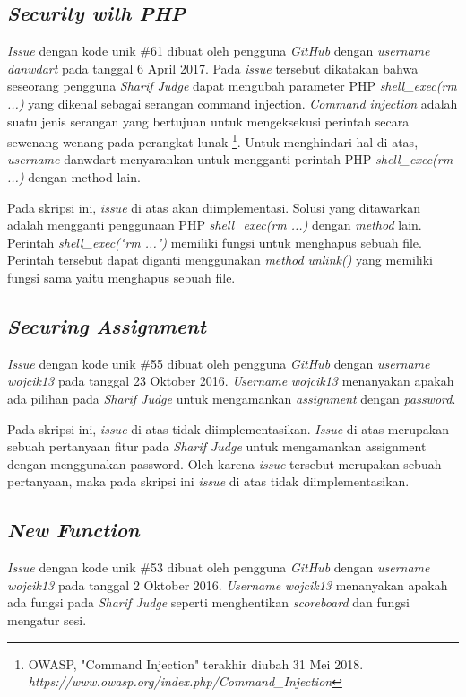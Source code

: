 \subsection{\textit{Security with PHP}}
\textit{Issue} dengan kode unik \#61 dibuat oleh pengguna \textit{GitHub} dengan \textit{username} \textit{danwdart} pada tanggal 6 April 2017. Pada \textit{issue} tersebut dikatakan bahwa seseorang pengguna \textit{Sharif Judge} dapat mengubah parameter PHP \textit{shell\_exec(rm ...)} yang dikenal sebagai serangan command injection. \textit{Command injection} adalah suatu jenis serangan yang bertujuan untuk mengeksekusi perintah secara sewenang-wenang pada perangkat lunak \footnote{OWASP, "Command Injection" terakhir diubah 31 Mei 2018. \textit{https://www.owasp.org/index.php/Command\_Injection}}. Untuk menghindari hal di atas, \textit{username} danwdart menyarankan untuk mengganti perintah PHP \textit{shell\_exec(rm ...)} dengan method lain.

Pada skripsi ini, \textit{issue} di atas akan diimplementasi. Solusi yang ditawarkan adalah mengganti penggunaan PHP \textit{shell\_exec(rm ...)} dengan \textit{method} lain.  Perintah \textit{shell\_exec("rm ...")} memiliki fungsi untuk menghapus sebuah file. Perintah tersebut dapat diganti menggunakan \textit{method} \textit{unlink()} yang memiliki fungsi sama yaitu menghapus sebuah file.

\subsection{\textit{Securing Assignment}}
\textit{Issue} dengan kode unik \#55 dibuat oleh pengguna \textit{GitHub} dengan \textit{username} \textit{wojcik13} pada tanggal 23 Oktober 2016. \textit{Username} \textit{wojcik13} menanyakan apakah ada pilihan pada \textit{Sharif Judge} untuk mengamankan \textit{assignment} dengan \textit{password}.

Pada skripsi ini, \textit{issue} di atas tidak diimplementasikan. \textit{Issue} di atas merupakan sebuah pertanyaan fitur pada \textit{Sharif Judge} untuk mengamankan assignment dengan menggunakan password. Oleh karena \textit{issue} tersebut merupakan sebuah pertanyaan, maka pada skripsi ini \textit{issue} di atas tidak diimplementasikan.

\subsection{\textit{New Function}}
\textit{Issue} dengan kode unik \#53 dibuat oleh pengguna \textit{GitHub} dengan \textit{username} \textit{wojcik13} pada tanggal 2 Oktober 2016. \textit{Username} \textit{wojcik13} menanyakan apakah ada fungsi pada \textit{Sharif Judge} seperti menghentikan \textit{scoreboard} dan fungsi mengatur sesi. 

